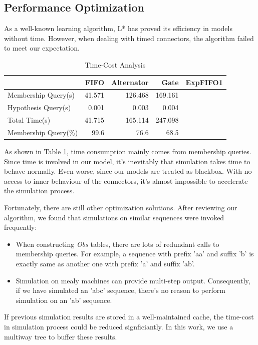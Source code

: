 \documentclass[conference, a4paper]{IEEEtran}
\begin{document}
\subsection{Performance Optimization}
As a well-known learning algorithm, L* has proved its efficiency in models without time.
However, when dealing with timed connectors, the algorithm failed to meet our expectation.

\begin{table}[ht]
  \renewcommand{\arraystretch}{1.3}
  \caption{Time-Cost Analysis}
  \label{tabel:timecost}
  \centering
  \begin{tabular}{l||rrrr}
    \hline
    & FIFO & Alternator & Gate & ExpFIFO1\\
    \hline\hline
    Membership Query(s) & 41.571 & 126.468 & 169.161 &\\
    Hypothesis Query(s) & 0.001 & 0.003 & 0.004 &\\
    Total Time(s) & 41.715 & 165.114 & 247.098 &\\
    Membership Query(\%) & 99.6 & 76.6 & 68.5 &\\
    \hline
  \end{tabular}
\end{table}

As shown in Table \ref{tabel:timecost}, time consumption mainly comes from membership queries.
Since time is involved in our model, it's inevitably that simulation takes time to behave normally.
Even worse, since our models are treated as blackbox. With no access to inner behaviour of the
connectors, it's almost impossible to accelerate the simulation process.

Fortunately, there are still other optimization solutions. After reviewing our algorithm, we found
that simulations on similar sequences were invoked frequently:

\begin{itemize}
  \item When constructing \emph{Obs} tables, there are lots of redundant calls to membership
    queries. For example, a sequence with prefix 'aa' and suffix 'b' is exactly same as another one
    with prefix 'a' and suffix 'ab'.
  \item Simulation on mealy machines can provide multi-step output. Consequently, if we have
    simulated an 'abc' sequence, there's no reason to perform simulation on an 'ab' sequence.
\end{itemize}

If previous simulation results are stored in a well-maintained cache, the time-cost in
simulation process could be reduced signficiantly. In this work, we use a multiway tree to buffer
these results.
\end{document}
